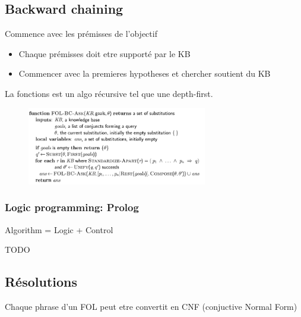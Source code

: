 	\subsection{Backward chaining}
		Commence  avec les prémisses de l'objectif
		\begin{itemize}
			\item Chaque prémisses doit etre supporté par le KB
			\item Commencer avec la premieres hypotheses et chercher soutient du KB
			
		\end{itemize}
		
		La fonctions est un algo récursive tel que une depth-first.
		
		\begin{figure}[htp]	
			\centering
			\includegraphics[width=0.7\textwidth]{img/BackWardChaining.png}
		\end{figure}		
		
		\subsubsection{Logic programming: Prolog}
			Algorithm = Logic + Control
			
			TODO
			
	\subsection{Résolutions}
		Chaque phrase d'un FOL peut etre convertit en CNF (conjuctive Normal Form)
			
